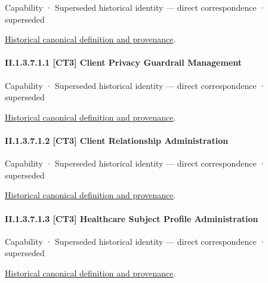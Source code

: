 \label{element:70d2a44a0442441f8b306b82b297bb8a}
{\small Capability · Superseded historical identity — direct correspondence · superseded}\par
\href{../../../../continuum/strategy/capability/70d2a44a0442441f8b306b82b297bb8a.md}{Historical canonical definition and provenance}.\par
\paragraph*{II.1.3.7.1.1 [CT3] Client Privacy Guardrail Management}
\label{navigation:II.1.3.7.1.1}

\label{element:d2e6078b5db041cb904e0cadcebce6eb}
{\small Capability · Superseded historical identity — direct correspondence · superseded}\par
\href{../../../../continuum/strategy/capability/d2e6078b5db041cb904e0cadcebce6eb.md}{Historical canonical definition and provenance}.\par
\paragraph*{II.1.3.7.1.2 [CT3] Client Relationship Administration}
\label{navigation:II.1.3.7.1.2}

\label{element:2c799ec0c4c74c97a75c12e949887b95}
{\small Capability · Superseded historical identity — direct correspondence · superseded}\par
\href{../../../../continuum/strategy/capability/2c799ec0c4c74c97a75c12e949887b95.md}{Historical canonical definition and provenance}.\par
\paragraph*{II.1.3.7.1.3 [CT3] Healthcare Subject Profile Administration}
\label{navigation:II.1.3.7.1.3}

\label{element:d653c3247ddd49479f985f6b435933a0}
{\small Capability · Superseded historical identity — direct correspondence · superseded}\par
\href{../../../../continuum/strategy/capability/d653c3247ddd49479f985f6b435933a0.md}{Historical canonical definition and provenance}.\par
